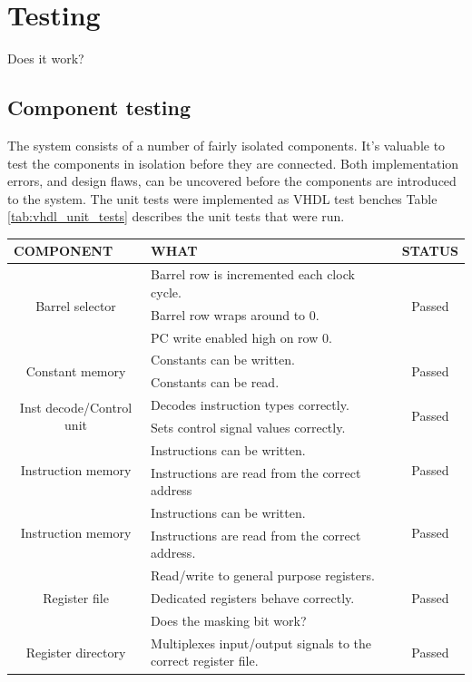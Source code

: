 \documentclass[../main/report.tex]{subfiles}
\begin{document}
\chapter{Testing}

Does it work?


\section{Component testing}
The system consists of a number of fairly isolated components.
It's valuable to test the components in isolation before they are connected.
Both implementation errors, and design flaws, can be uncovered before the components are introduced to the system.
The unit tests were implemented as VHDL test benches
Table \ref{tab:vhdl_unit_tests} describes the unit tests that were run.
\begin{table}[H]
	\centering
	\begin{tabularx}{\textwidth}{|c|X|c|}
	        \multicolumn{1}{l}{\scriptsize COMPONENT} &
	        \multicolumn{1}{l}{\scriptsize WHAT} &
	        \multicolumn{1}{l}{\scriptsize STATUS} \\
	\hline  \multirow{3}{*}{Barrel selector} 		  & Barrel row is incremented each clock cycle.  & \multirow{3}{*}{ Passed } \\
	 										 		  & Barrel row wraps around to 0. & \\			
	 										 		  & PC write enabled high on row 0.& \\								
	\hline  \multirow{2}{*}{Constant memory} 	      & Constants can be written.  & \multirow{2}{*}{ Passed } \\
	 										 		  & Constants can be read. & \\												
	\hline \multirow{2}{*}{Inst decode/Control unit}  & Decodes instruction types correctly. & \multirow{2}{*}{ Passed } \\
		   											  & Sets control signal values correctly. &\\
	\hline \multirow{2}{*}{Instruction memory} 		  & Instructions can be written. & \multirow{2}{*}{ Passed } \\
													  & Instructions are read from the correct address  & \\ 
	\hline \multirow{2}{*}{Instruction memory} 		  & Instructions can be written. & \multirow{2}{*}{ Passed } \\
													  & Instructions are read from the correct address.  & \\ 
	\hline \multirow{3}{*}{Register file} 		  	  & Read/write to general purpose registers. & \multirow{3}{*}{ Passed } \\
													  & Dedicated registers behave correctly.  & \\ 
													  & Does the masking bit work?  & \\ 													  
	\hline  Register directory 		 				  & Multiplexes input/output signals to the correct register file. & Passed  \\
	

\end{tabularx}
\end{table}
\end{document}
